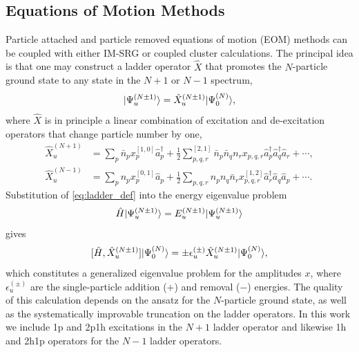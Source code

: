 \subsection{Equations of Motion Methods}

Particle attached and particle removed equations of motion (EOM) methods can be coupled with either IM-SRG or coupled cluster calculations. The principal idea is that one may construct a ladder operator $\hat{X}$ that promotes the $N$-particle ground state to any state in the $N + 1$ or $N - 1$ spectrum,
\begin{equation}\label{eq:ladder_def}
  | \Psi^{(N \pm 1)}_u \rangle  = \hat{X}^{(N \pm 1)}_u | \Psi^{(N)}_0 \rangle,
\end{equation}
where $\hat{X}$ is in principle a linear combination of excitation and de-excitation operators that change particle number by one,
\begin{align}
  \label{eq:gen_attached}
  \hat{X}^{(N+1)}_u &= \sum_p \bar{n}_p x^{[1,0]}_p  \hat{a}^\dagger_p + \frac{1}{2} \sum^{[2,1]}_{p, q, r} \bar{n}_p \bar{n}_q n_r x_{p, q, r} \hat{a}^\dagger_p \hat{a}^\dagger_q \hat{a}_r + \cdots,  \\
  \label{eq:gen_removed}
  \hat{X}^{(N-1)}_u &= \sum_p n_p x_p^{[0,1]} \hat{a}_p + \frac{1}{2} \sum_{p, q, r} n_p n_q \bar{n}_r  x^{[1,2]}_{p, q, r} \hat{a}^\dagger_r \hat{a}_q \hat{a}_p  + \cdots.
\end{align}
Substitution of \eqref{eq:ladder_def} into the energy eigenvalue problem
\begin{gather*}
  \hat H | \Psi_u^{(N \pm 1)} \rangle = E^{(N\pm1)}_u | \Psi_u^{(N \pm 1)} \rangle
\end{gather*}
gives
\begin{equation}\label{eq:EOM}
  [\hat{H}, \hat{X}^{(N \pm 1)}_u] | \Psi^{(N)}_0 \rangle = \pm \epsilon^{(\pm)}_u \hat{X}^{(N \pm 1)}_u | \Psi^{(N)}_0 \rangle,
\end{equation}
which constitutes a generalized eigenvalue problem for the amplitudes $x$, where $\epsilon^{(\pm)}_u$ are the single-particle addition ($+$) and removal ($-$) energies. The quality of this calculation depends on the ansatz for the $N$-particle ground state, as well as the systematically improvable truncation on the ladder operators. In this work we include 1p and 2p1h excitations in the $N + 1$ ladder operator and likewise 1h and 2h1p operators for the $N - 1$ ladder operators.

